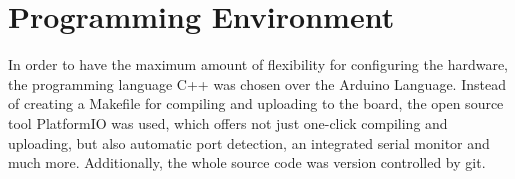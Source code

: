 \section{Programming Environment}

In order to have the maximum amount of flexibility for configuring the hardware, the programming language C++ was chosen over the Arduino Language. Instead of creating a Makefile for compiling and uploading to the board, the open source tool PlatformIO was used, which offers not just one-click compiling and uploading, but also automatic port detection, an integrated serial monitor and much more. Additionally, the whole source code was version controlled by git.